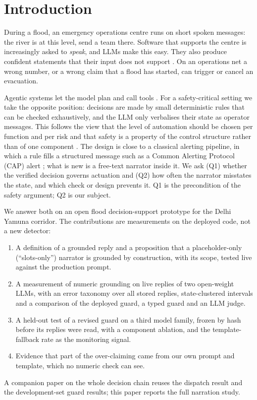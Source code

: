 \documentclass[conference]{IEEEtran}
\begin{document}
\section{Introduction}
During a flood, an emergency operations centre runs on short spoken messages: the river is at this level, send a team there. Software that supports the centre is increasingly asked to \emph{speak}, and LLMs make this easy. They also produce confident statements that their input does not support \cite{Ji2023}. On an operations net a wrong number, or a wrong claim that a flood has started, can trigger or cancel an evacuation.

Agentic systems let the model plan and call tools \cite{Yao2023,Wu2024}. For a safety-critical setting we take the opposite position: decisions are made by small deterministic rules that can be checked exhaustively, and the LLM only verbalises their state as operator messages. This follows the view that the level of automation should be chosen per function and per risk \cite{Parasuraman2000} and that safety is a property of the control structure rather than of one component \cite{Leveson2011}. The design is close to a classical alerting pipeline, in which a rule fills a structured message such as a Common Alerting Protocol (CAP) alert \cite{CAP2010}; what is new is a free-text narrator inside it. We ask (Q1) whether the verified decision governs actuation and (Q2) how often the narrator misstates the state, and which check or design prevents it. Q1 is the precondition of the safety argument; Q2 is our subject.

We answer both on an open flood decision-support prototype for the Delhi Yamuna corridor. The contributions are measurements on the deployed code, not a new detector:
\begin{enumerate}
\item A definition of a grounded reply and a proposition that a placeholder-only (``slots-only'') narrator is grounded by construction, with its scope, tested live against the production prompt.
\item A measurement of numeric grounding on \LiveN{} live replies of two open-weight LLMs, with an error taxonomy over all \TaxN{} stored replies, state-clustered intervals and a comparison of the deployed guard, a typed guard and an LLM judge.
\item A held-out test of a revised guard on a third model family, frozen by hash before its replies were read, with a component ablation, and the template-fallback rate as the monitoring signal.
\item Evidence that part of the over-claiming came from our own prompt and template, which no numeric check can see.
\end{enumerate}
A companion paper on the whole decision chain reuses the dispatch result and the development-set guard results; this paper reports the full narration study.
\end{document}

